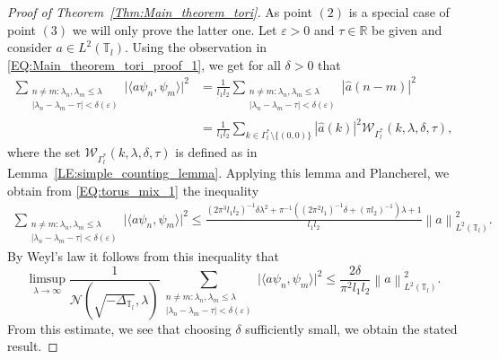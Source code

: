 \documentclass[11pt,twoside,reqno]{amsart}
\newcommand{\R}{\mathbb{R}}
\newcommand{\1}{\mathrm{\mathbf{1}}}
\newcommand{\norm}[1]{\left\lVert#1\right\rVert}
\numberwithin{equation}{section}
\theoremstyle{plain}
\theoremstyle{definition}
\theoremstyle{remark}
\begin{document}
\begin{proof}[Proof of Theorem~\ref{Thm:Main_theorem_tori}]
As point $(2)$ is a special case of point $(3)$ we will only prove the latter one. Let $\varepsilon>0$ and $\tau\in\R$ be given and consider $a \in L^2(\mathbb{T}_{l})$. Using the observation in \eqref{EQ:Main_theorem_tori_proof_1}, we get for all $\delta>0$ that 
\begin{equation}\label{EQ:torus_mix_1}
        \begin{aligned}
         \sum_{\substack{n\neq m: \lambda_n,\lambda_m\leq \lambda  \\ |\lambda_{n}-\lambda_{m}-\tau| < \delta(\varepsilon)}} \big| \langle a \psi_n , \psi_m\rangle  \big|^2  
         &= \frac{1}{ l_1 l_2}  \sum_{\substack{n\neq m: \lambda_n,\lambda_m\leq \lambda  \\ |\lambda_{n}-\lambda_{m}-\tau| < \delta(\varepsilon)}} |\hat{a}(n-m)|^2 
         \\
         &= \frac{1}{ l_1 l_2} \sum_{k\in\Gamma_l^{*}\setminus\{(0,0)\}} |\hat{a}(k)|^2\mathcal{W}_{\Gamma_l^{*}}(k,\lambda,\delta,\tau) ,
        \end{aligned}
    \end{equation}
    where the set $\mathcal{W}_{\Gamma_l^{*}}(k,\lambda,\delta,\tau)$ is defined as in Lemma~\ref{LE:simple_counting_lemma}. Applying this lemma and Plancherel, we obtain from \eqref{EQ:torus_mix_1} the inequality
    \begin{equation*}
        \begin{aligned}
         \sum_{\substack{n\neq m: \lambda_n,\lambda_m\leq \lambda  \\ |\lambda_{n}-\lambda_{m}-\tau| < \delta(\varepsilon)}} \big| \langle a \psi_n , \psi_m\rangle  \big|^2  
         \leq \frac{(2\pi^3 l_1l_2)^{-1}\delta\lambda^2 +\pi^{-1}((2\pi^2 l_1)^{-1}\delta +(\pi l_2)^{-1})\lambda +1}{ l_1 l_2} \norm{a}_{L^2(\mathbb{T}_{l})}^2.
        \end{aligned}
    \end{equation*}
    By Weyl's law it follows from this inequality that 
    \begin{equation*}
        \limsup_{\lambda\rightarrow \infty}\frac{1}{\mathcal{N}(\sqrt{-\Delta_{\mathbb{T}_{l}}},\lambda)} \sum_{\substack{n\neq m: \lambda_n,\lambda_m\leq \lambda  \\ |\lambda_{n}-\lambda_{m}-\tau| < \delta(\varepsilon)}} \big| \langle a \psi_n , \psi_m\rangle  \big|^2 \leq \frac{2\delta }{\pi^2 l_1 l_2} \norm{a}_{L^2(\mathbb{T}_{l})}^2.
    \end{equation*}
    From this estimate, we see that choosing $\delta$ sufficiently small, we obtain the stated result.
\end{proof}
\end{document}
